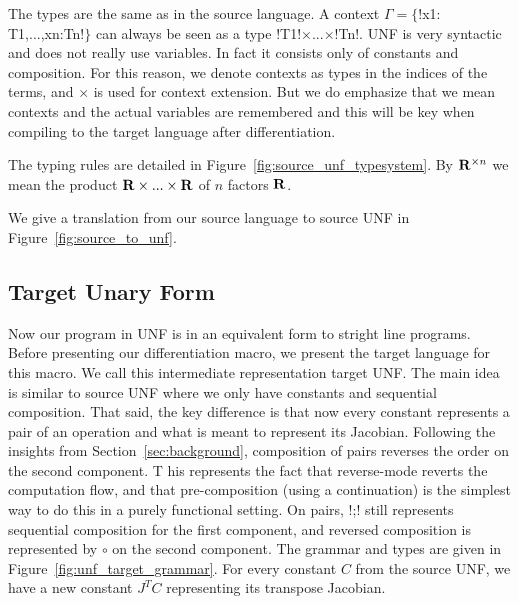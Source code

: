 The types are the same as in the source language. 
A context $\Gamma=\{$!x1: T1,...,xn:Tn!$\}$ can always be seen as a type !T1!$\times$...$\times$!Tn!.
UNF is very syntactic and does not really use variables. 
In fact it consists only of constants and composition. 
For this reason, we denote contexts as types in the indices of the terms, and $\times$ is used for context extension.
But we do emphasize that we mean contexts and the actual variables are remembered and
this will be key when compiling to the target language after differentiation. 

The typing rules are detailed in Figure~\ref{fig:source_unf_typesystem}.
By $\mathbf{R}^{\times n}$ we mean the product $\mathbf{R}\times...\times\mathbf{R}$ of $n$ factors $\mathbf{R}$.




We give a translation from our source language to source UNF in Figure~\ref{fig:source_to_unf}.




\subsection{Target Unary Form}

Now our program in UNF is in an equivalent form to stright line programs. 
Before presenting our differentiation macro, we present the target language for this macro. 
We call this intermediate representation target UNF.
The main idea is similar to source UNF where we only have constants and sequential composition.
That said, the key difference is that now every constant represents a pair of an operation and what is meant to represent its Jacobian.
Following the insights from Section~\ref{sec:background}, composition of pairs reverses the order on the second component. T
his represents the fact that reverse-mode reverts the computation flow, 
and that pre-composition (using a continuation) is the simplest way to do this in a purely functional setting.
On pairs, !;! still represents sequential composition for the first component, and reversed composition is represented by $\circ$ on the second component.
The grammar and types are given in Figure~\ref{fig:unf_target_grammar}.
For every constant $C$ from the source UNF, we have a new constant $J^TC$ representing its transpose Jacobian.

